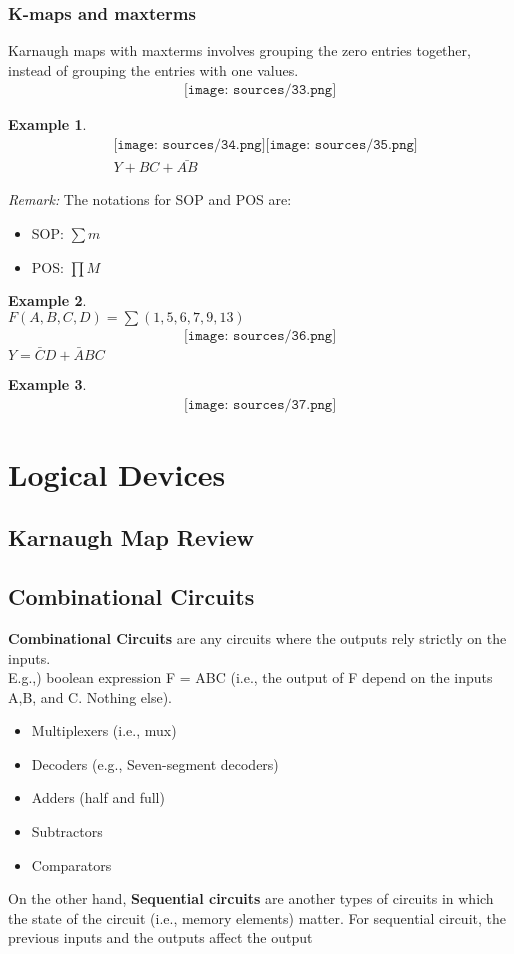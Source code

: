 \documentclass[12pt]{article}
\theoremstyle{definition}
\newtheorem{example}{Example}[section]
\begin{document}
\subsubsection{K-maps and maxterms}
Karnaugh maps with maxterms involves grouping the zero entries together, instead of grouping the entries with one values.
\begin{align*}
    \texttt{[image: sources/33.png]}
\end{align*}
\begin{example}
    \begin{align*}
        &\texttt{[image: sources/34.png]}
        \texttt{[image: sources/35.png]}\\
        &Y+BC+\bar{AB}
    \end{align*}
\end{example}
\textit{Remark:} The notations for SOP and POS are:
\begin{itemize}
    \item SOP: $\sum m$
    \item POS: $\prod M$
\end{itemize}
\newpage
\begin{example}
    \ \\
    $F(A,B,C,D)=\sum(1,5,6,7,9,13)$
    \begin{align*}
        \texttt{[image: sources/36.png]}
    \end{align*}
    $Y=\bar{C}D+\bar{A}BC$
\end{example}
\begin{example}
    \begin{align*}
        \texttt{[image: sources/37.png]}        
    \end{align*}
\end{example}
\section{Logical Devices}
\subsection{Karnaugh Map Review}
\subsection{Combinational Circuits}
\textbf{Combinational Circuits} are any circuits where the outputs rely strictly on the inputs.\\
E.g.,) boolean expression F = ABC (i.e., the output of F depend on the inputs A,B, and C. Nothing else).
\begin{itemize}
    \item Multiplexers (i.e., mux)
    \item Decoders (e.g., Seven-segment decoders)
    \item Adders (half and full)
    \item Subtractors
    \item Comparators
\end{itemize}
On the other hand, \textbf{Sequential circuits} are another types of circuits in which the state of the circuit (i.e., memory elements) matter. For sequential circuit, the previous inputs and the outputs affect the output
\end{document}
